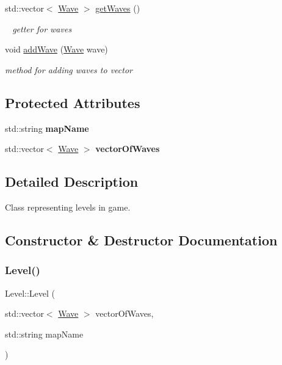 \begin{DoxyCompactItemize}
\mbox{\label{class_level_a7bd752a7575a494d713f6cc548cce015}} 
std\+::vector$<$ \mbox{\hyperlink{class_wave}{Wave}} $>$ \mbox{\hyperlink{class_level_a7bd752a7575a494d713f6cc548cce015}{get\+Waves}} ()
\begin{DoxyCompactList}\small\item\em ~\newline
getter for waves \end{DoxyCompactList}\item 
void \mbox{\hyperlink{class_level_a1aa9a0d5da3c3a2763620de72c336dcc}{add\+Wave}} (\mbox{\hyperlink{class_wave}{Wave}} wave)
\begin{DoxyCompactList}\small\item\em method for adding waves to vector \end{DoxyCompactList}\end{DoxyCompactItemize}
\subsection*{Protected Attributes}
\begin{DoxyCompactItemize}
\item 
\mbox{\label{class_level_abeec0fb04d67ff914e6393bd49d78dc9}} 
std\+::string {\bfseries map\+Name}
\item 
\mbox{\label{class_level_af96606a75a04d4f00a0a426881e6df32}} 
std\+::vector$<$ \mbox{\hyperlink{class_wave}{Wave}} $>$ {\bfseries vector\+Of\+Waves}
\end{DoxyCompactItemize}


\subsection{Detailed Description}
Class representing levels in game. 

\subsection{Constructor \& Destructor Documentation}
\mbox{\label{class_level_ac3219336ec0edadd14e4c8bd012ede11}} 
\subsubsection{\texorpdfstring{Level()}{Level()}}
{\footnotesize\ttfamily Level\+::\+Level (\begin{DoxyParamCaption}\item[{std\+::vector$<$ \mbox{\hyperlink{class_wave}{Wave}} $>$}]{vector\+Of\+Waves,  }\item[{std\+::string}]{map\+Name }\end{DoxyParamCaption})}



